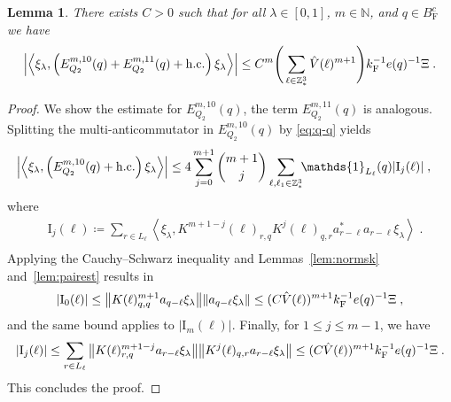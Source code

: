 \documentclass[12pt,a4paper]{article}
\numberwithin{equation}{section}
\newcommand{\NNN}{\mathbb{N}}
\newcommand{\1}{\mathbb{I}}
\newcommand{\F}{\mathrm{F}}
\newcommand{\I}{\mathrm{I}}
\newcommand{\Z}{\mathbb{Z}}
\newcommand{\eva}[1]{\left\langle #1 \right\rangle}
\theoremstyle{plain}
\newtheorem{lemma}[theorem]{Lemma}
\theoremstyle{definition}
\theoremstyle{remark}
\theoremstyle{plain}
\theoremstyle{definition}
\theoremstyle{remark}
\begin{document}
\begin{lemma} \label{lem:EQ212}
There exists $ C > 0 $ such that for all $ \lambda \in [0,1] $, $ m \in \NNN $, and $ q \in B_{\F}^c $ we have
\begin{equation}
	\abs{\eva{\xi_\lambda,\left(E^{m,10}_{Q_2}(q) + E^{m,11}_{Q_2}(q) + \mathrm{h.c.}\right) \xi_\lambda }}
	\leq C^m \Bigg( \sum_{\ell \in \Z^3_*} \hat{V}(\ell)^{m+1} \Bigg)
		k_{\F}^{-1} e(q)^{-1} \Xi \;. \label{eq:estEQ212}
\end{equation}
\end{lemma}

\begin{proof}
We show the estimate for $ E^{m,10}_{Q_2}(q) $, the term $ E^{m,11}_{Q_2}(q) $ is analogous.
Splitting the multi-anticommutator in $ E^{m,10}_{Q_2}(q) $ by \eqref{eq:q-q} yields
\begin{equation} \label{eq:EQ2121}
\begin{aligned}
	& \abs{\eva{\xi_\lambda,\left(E^{m,10}_{Q_2}(q) + \mathrm{h.c.}\right) \xi_\lambda }}
	\le 4 \sum_{j=0}^{m+1} {{m+1}\choose j} \sum_{\ell,\ell_1  \in \Z^3_*}\!\! \mathds{1}_{L_\ell}(q) |\I_j(\ell)| \;,
\end{aligned}
\end{equation}
where
\begin{equation}
\begin{aligned}
	& \I_j(\ell)
	\coloneq \sum_{r\in L_{\ell}}
		\eva{\xi_\lambda, K^{m+1-j}(\ell)_{r,q} K^{j}(\ell)_{q,r} a^*_{r-\ell} a_{r-\ell} \xi_\lambda} \;. \\
\end{aligned}
\end{equation}
Applying the Cauchy--Schwarz inequality and Lemmas~\ref{lem:normsk} and~\ref{lem:pairest} results in
\begin{equation}
	|\I_0(\ell)|
	\leq \norm{ K(\ell)^{m+1}_{q,q} a_{q-\ell} \xi_\lambda}\norm{ a_{q-\ell} \xi_\lambda }
	\leq (C \hat{V}(\ell))^{m+1}
		k_{\F}^{-1} e(q)^{-1} \Xi \;,\label{eq:estEQ2121}
\end{equation}
and the same bound applies to $ |\I_m(\ell)| $. Finally, for $ 1 \le j \le m-1 $, we have
\begin{equation}
	|\I_j(\ell)|
	\leq \sum_{r \in L_{\ell}} \norm{ K(\ell)^{m+1-j}_{r,q} a_{r-\ell}\xi_\lambda}\norm{ K^j(\ell)_{q,r} a_{r-\ell} \xi_\lambda }
	\leq (C \hat{V}(\ell))^{m+1}
		k_{\F}^{-1} e(q)^{-1} \Xi \;. \nonumber
\end{equation}
This concludes the proof.
\end{proof}
\end{document}

